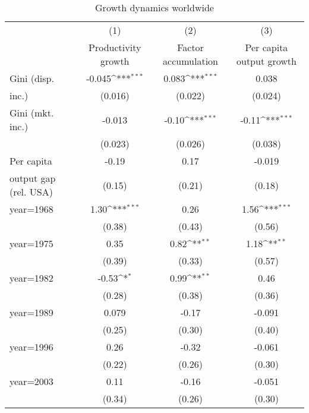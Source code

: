 \begin{sidewaystable}[htbp]\centering
\def\sym#1{\ifmmode^{#1}\else\(^{#1}\)\fi}
\caption{Growth dynamics worldwide}
\begin{tabular}{l*{3}{c}}
\hline\hline
                &\multicolumn{1}{c}{(1)}&\multicolumn{1}{c}{(2)}&\multicolumn{1}{c}{(3)}\\
                &\multicolumn{1}{c}{Productivity growth}&\multicolumn{1}{c}{Factor accumulation}&\multicolumn{1}{c}{Per capita output growth}\\
\hline
Gini (disp.     &   -0.045\sym{***}&    0.083\sym{***}&    0.038         \\
inc.)           &  (0.016)         &  (0.022)         &  (0.024)         \\
[1em]
Gini (mkt. inc.)&   -0.013         &    -0.10\sym{***}&    -0.11\sym{***}\\
                &  (0.023)         &  (0.026)         &  (0.038)         \\
[1em]
Per capita      &    -0.19         &     0.17         &   -0.019         \\
output gap (rel. USA)&   (0.15)         &   (0.21)         &   (0.18)         \\
[1em]
year=1968       &     1.30\sym{***}&     0.26         &     1.56\sym{***}\\
                &   (0.38)         &   (0.43)         &   (0.56)         \\
[1em]
year=1975       &     0.35         &     0.82\sym{**} &     1.18\sym{**} \\
                &   (0.39)         &   (0.33)         &   (0.57)         \\
[1em]
year=1982       &    -0.53\sym{*}  &     0.99\sym{**} &     0.46         \\
                &   (0.28)         &   (0.38)         &   (0.36)         \\
[1em]
year=1989       &    0.079         &    -0.17         &   -0.091         \\
                &   (0.25)         &   (0.30)         &   (0.40)         \\
[1em]
year=1996       &     0.26         &    -0.32         &   -0.061         \\
                &   (0.22)         &   (0.26)         &   (0.30)         \\
[1em]
year=2003       &     0.11         &    -0.16         &   -0.051         \\
                &   (0.34)         &   (0.26)         &   (0.30)         \\

\end{tabular}
\end{sidewaystable}
